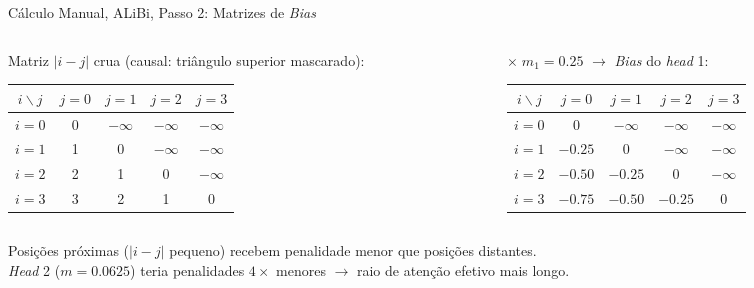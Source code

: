 \documentclass[aspectratio=169, xcolor=dvipsnames]{beamer}
\begin{document}
  \begin{frame}{Cálculo Manual, ALiBi, Passo 2: Matrizes de \textit{Bias}}
    \begin{columns}
      \begin{column}{0.45\textwidth}
        Matriz $|i - j|$ crua (causal: triângulo superior mascarado):

        {\scriptsize
        \begin{tabular}{c|cccc}
          \toprule
          $i \backslash j$ & $j{=}0$ & $j{=}1$ & $j{=}2$ & $j{=}3$ \\
          \midrule
          $i{=}0$ & 0 & $-\infty$ & $-\infty$ & $-\infty$ \\
          $i{=}1$ & 1 & 0 & $-\infty$ & $-\infty$ \\
          $i{=}2$ & 2 & 1 & 0 & $-\infty$ \\
          $i{=}3$ & 3 & 2 & 1 & 0 \\
          \bottomrule
        \end{tabular}}
      \end{column}
      \begin{column}{0.52\textwidth}
        $\times\; m_1 = 0.25$ $\to$ \textit{Bias} do \textit{head} 1:

        {\scriptsize
        \begin{tabular}{c|cccc}
          \toprule
          $i \backslash j$ & $j{=}0$ & $j{=}1$ & $j{=}2$ & $j{=}3$ \\
          \midrule
          \rowcolor{CellGreen} $i{=}0$ & 0 & $-\infty$ & $-\infty$ & $-\infty$ \\
          \rowcolor{CellGreen} $i{=}1$ & $-0.25$ & 0 & $-\infty$ & $-\infty$ \\
          \rowcolor{CellGreen} $i{=}2$ & $-0.50$ & $-0.25$ & 0 & $-\infty$ \\
          \rowcolor{CellGreen} $i{=}3$ & $-0.75$ & $-0.50$ & $-0.25$ & 0 \\
          \bottomrule
        \end{tabular}}
      \end{column}
    \end{columns}

    \vspace{0.5em}
    Posições próximas ($|i{-}j|$ pequeno) recebem penalidade menor que posições distantes.\\
    \textit{Head} 2 ($m=0.0625$) teria penalidades $4\times$ menores $\to$ raio de atenção efetivo mais longo.
  \end{frame}
\end{document}
